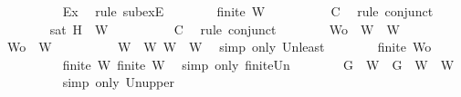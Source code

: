 \begin{isabellebody}
\ \ \ \ \ \ \ \ \isamarkupfalse%
\ Ex{}\ \isamarkupfalse%
\ {\isacharparenleft}rule\ subexE{\isacharparenright}\isanewline
\ \ \ \ \ \ \isamarkupfalse%
\ {\isachardoublequoteopen}finite\ W{}{\isachardoublequoteclose}\isanewline
\ \ \ \ \ \ \ \ \isamarkupfalse%
\ C{}\ \isamarkupfalse%
\ {\isacharparenleft}rule\ conjunct{}{\isacharparenright}\isanewline
\ \ \ \ \ \ \isamarkupfalse%
\ {\isachardoublequoteopen}{\isasymnot}{\isacharparenleft}sat\ {\isacharparenleft}{\isacharbraceleft}H{\isacharbraceright}\ {\isasymunion}\ W{}{\isacharparenright}{\isacharparenright}{\isachardoublequoteclose}\isanewline
\ \ \ \ \ \ \ \ \isamarkupfalse%
\ C{}\ \isamarkupfalse%
\ {\isacharparenleft}rule\ conjunct{}{\isacharparenright}\isanewline
\ \ \ \ \ \ \isamarkupfalse%
\ {\isacharquery}Wo\ {\isacharequal}\ {\isachardoublequoteopen}W{}\ {\isasymunion}\ W{}{\isachardoublequoteclose}\isanewline
\ \ \ \ \ \ \isamarkupfalse%
\ {\isachardoublequoteopen}{\isacharquery}Wo\ {\isasymsubseteq}\ W{\isachardoublequoteclose}\isanewline
\ \ \ \ \ \ \ \ \isamarkupfalse%
\ {\isacartoucheopen}W{}\ {\isasymsubseteq}\ W{\isacartoucheclose}\ {\isacartoucheopen}W{}\ {\isasymsubseteq}\ W{\isacartoucheclose}\ \isamarkupfalse%
\ {\isacharparenleft}simp\ only{\isacharcolon}\ Un{\isacharunderscore}least{\isacharparenright}\isanewline
\ \ \ \ \ \ \isamarkupfalse%
\ {\isachardoublequoteopen}finite\ {\isacharquery}Wo{\isachardoublequoteclose}\isanewline
\ \ \ \ \ \ \ \ \isamarkupfalse%
\ {\isacartoucheopen}finite\ W{}{\isacartoucheclose}\ {\isacartoucheopen}finite\ W{}{\isacartoucheclose}\ \isamarkupfalse%
\ {\isacharparenleft}simp\ only{\isacharcolon}\ finite{\isacharunderscore}Un{\isacharparenright}\isanewline
\ \ \ \ \ \ \isamarkupfalse%
\ {\isachardoublequoteopen}{\isacharbraceleft}G{\isacharbraceright}\ {\isasymunion}\ W{}\ {\isasymsubseteq}\ {\isacharparenleft}{\isacharbraceleft}G{\isacharbraceright}\ {\isasymunion}\ W{}{\isacharparenright}\ {\isasymunion}\ W{}{\isachardoublequoteclose}\isanewline
\ \ \ \ \ \ \ \ \isamarkupfalse%
\ {\isacharparenleft}simp\ only{\isacharcolon}\ Un{\isacharunderscore}upper{}{\isacharparenright}\isanewline

\end{isabellebody}
